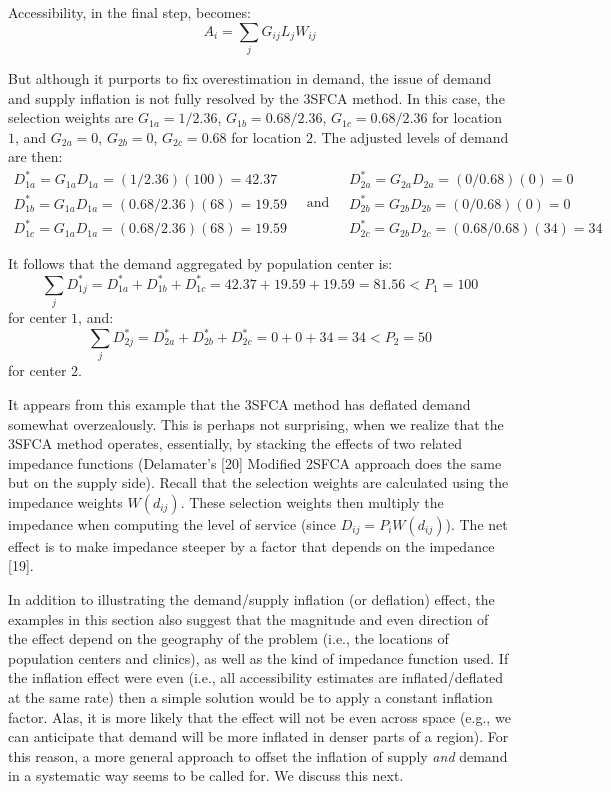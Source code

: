\documentclass[10pt,letterpaper]{article}
\begin{document}
Accessibility, in the final step, becomes: \[
A_i = \sum_jG_{ij}L_jW_{ij}
\]

But although it purports to fix overestimation in demand, the issue of
demand and supply inflation is not fully resolved by the 3SFCA method.
In this case, the selection weights are \(G_{1a} = 1/2.36\),
\(G_{1b} = 0.68/2.36\), \(G_{1c} = 0.68/2.36\) for location \(1\), and
\(G_{2a} = 0\), \(G_{2b} = 0\), \(G_{2c} = 0.68\) for location \(2\).
The adjusted levels of demand are then: \[
\begin{array}{l}
            D^*_{1a} = G_{1a}D_{1a} = (1/2.36)(100) = 42.37 \\
            D^*_{1b} = G_{1a}D_{1a} = (0.68/2.36)(68) = 19.59 \\
            D^*_{1c} = G_{1a}D_{1a} = (0.68/2.36)(68) = 19.59
\end{array}\quad \text{and}\quad
\begin{array}{ll}
            D^*_{2a} = G_{2a}D_{2a} = (0/0.68)(0) = 0 \\
            D^*_{2b} = G_{2b}D_{2b} = (0/0.68)(0) = 0 \\
            D^*_{2c} = G_{2b}D_{2c} = (0.68/0.68)(34) = 34
\end{array}
\]

It follows that the demand aggregated by population center is: \[
\sum_jD^*_{1j} = D^*_{1a} + D^*_{1b} + D^*_{1c} = 42.37 + 19.59 + 19.59 = 81.56 < P_1 = 100
\] for center \(1\), and: \[
\sum_jD^*_{2j} = D^*_{2a} + D^*_{2b} + D^*_{2c} = 0 + 0 + 34 = 34 < P_2 = 50
\] for center \(2\).

It appears from this example that the 3SFCA method has deflated demand
somewhat overzealously. This is perhaps not surprising, when we realize
that the 3SFCA method operates, essentially, by stacking the effects of
two related impedance functions (Delamater's {[}20{]} Modified 2SFCA
approach does the same but on the supply side). Recall that the
selection weights are calculated using the impedance weights
\(W(d_{ij})\). These selection weights then multiply the impedance when
computing the level of service (since \(D_{ij} = P_iW(d_{ij})\)). The
net effect is to make impedance steeper by a factor that depends on the
impedance {[}19{]}.

In addition to illustrating the demand/supply inflation (or deflation)
effect, the examples in this section also suggest that the magnitude and
even direction of the effect depend on the geography of the problem
(i.e., the locations of population centers and clinics), as well as the
kind of impedance function used. If the inflation effect were even
(i.e., all accessibility estimates are inflated/deflated at the same
rate) then a simple solution would be to apply a constant inflation
factor. Alas, it is more likely that the effect will not be even across
space (e.g., we can anticipate that demand will be more inflated in
denser parts of a region). For this reason, a more general approach to
offset the inflation of supply \emph{and} demand in a systematic way
seems to be called for. We discuss this next.
\end{document}
